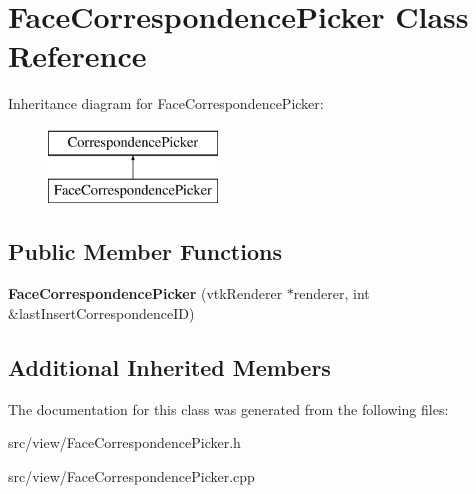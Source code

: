 \hypertarget{class_face_correspondence_picker}{}\section{Face\+Correspondence\+Picker Class Reference}
\label{class_face_correspondence_picker}
Inheritance diagram for Face\+Correspondence\+Picker\+:\begin{figure}[H]
\begin{center}
\leavevmode
\includegraphics[height=2.000000cm]{class_face_correspondence_picker}
\end{center}
\end{figure}
\subsection*{Public Member Functions}
\begin{DoxyCompactItemize}
\item 
\hypertarget{class_face_correspondence_picker_afe96b5ac734a37e06f3be9723e552835}{}{\bfseries Face\+Correspondence\+Picker} (vtk\+Renderer $\ast$renderer, int \&last\+Insert\+Correspondence\+I\+D)\label{class_face_correspondence_picker_afe96b5ac734a37e06f3be9723e552835}

\end{DoxyCompactItemize}
\subsection*{Additional Inherited Members}


The documentation for this class was generated from the following files\+:\begin{DoxyCompactItemize}
\item 
src/view/Face\+Correspondence\+Picker.\+h\item 
src/view/Face\+Correspondence\+Picker.\+cpp\end{DoxyCompactItemize}
